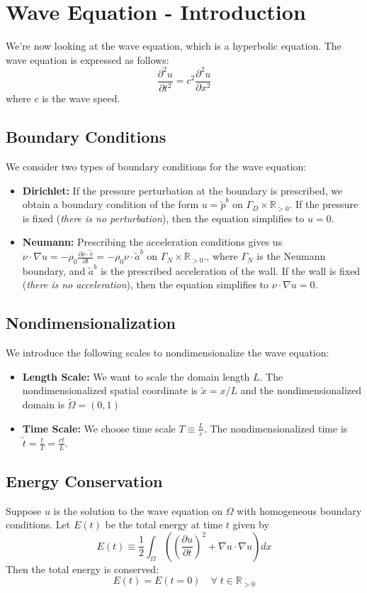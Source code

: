 \documentclass[11pt]{article}
\newcommand{\R}{\mathbb{R}}
\begin{document}
\section{Wave Equation - Introduction }
We're now looking at the wave equation, which is a hyperbolic equation. The wave equation is expressed as follows:
$$ \frac{\partial^2 u}{\partial t^2} = c^2 \frac{\partial^2 u}{\partial x^2} $$
where $c$ is the wave speed. 

\subsection{Boundary Conditions}
We consider two types of boundary conditions for the wave equation:
\begin{itemize}
\item \textbf{Dirichlet:} If the pressure perturbation at the boundary is prescribed, we obtain a boundary condition of the form $u=\tilde{p}^b$ on $\Gamma_D \times \R_{>0}$.  If the pressure is fixed (\textit{there is no perturbation}), then the equation simplifies to $u = 0$.
\item \textbf{Neumann:} Prescribing the acceleration conditions gives us $\nu \cdot \nabla u = -\rho_0 \frac{\partial \nu \cdot \tilde{v}}{\partial t} = -\rho_0 \nu \cdot \tilde{a}^b$ on $\Gamma_N \times \R_{>0}$., where $\Gamma_N$ is the Neumann boundary, and $ \tilde{a}^b$ is the prescribed acceleration of the wall. If the wall is fixed (\textit{there is no acceleration}), then the equation simplifies to $\nu \cdot \nabla u = 0$.
\end{itemize}

\subsection{Nondimensionalization}
We introduce the following scales to nondimensionalize the wave equation:
\begin{itemize}
\item \textbf{Length Scale:} We want to scale the domain length $L$. The nondimensionalized spatial coordinate is $\tilde{x} = x/L$ and the nondimensionalized domain is $\tilde{\Omega}  = (0, 1)$
\item \textbf{Time Scale:} We choose time scale $T \equiv \frac{L}{c}$. The nondimensionalized time is $\tilde{t} = \frac{t}{T}= \frac{ct}{L}$.
\end{itemize}

\subsection{Energy Conservation}
Suppose $u$ is the solution to the wave equation on $\Omega$ with homogeneous boundary conditions.  Let $E(t)$ be the total energy at time $t$ given by
$$ E(t) \equiv \frac{1}{2} \int_{\Omega} \left( \left( \frac{\partial u}{\partial t} \right)^2  + \nabla u \cdot \nabla u \right) dx$$
Then the total energy is conserved:
$$ E(t) = E(t=0) \quad \forall \; t \in \R_{>0} $$
\end{document}

